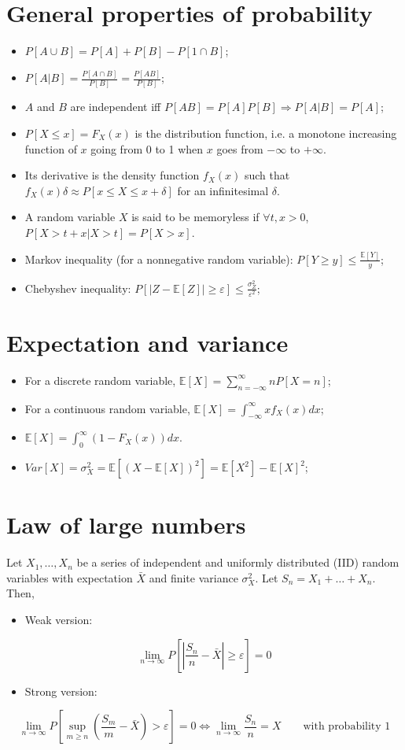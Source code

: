 \documentclass[12pt, openany]{report}
\newcommand{\E}{\mathbb{E}}
\theoremstyle{definition}
\begin{document}
\section{General properties of probability}
\begin{itemize}
  \item $P[A\cup B]=P[A]+P[B]-P[1\cap B]$;
  \item $P[A|B] = \frac{P[A\cap B]}{P[B]} = \frac{P[AB]}{P[B]}$;
  \item $A$ and $B$ are independent iff $P[AB]=P[A]P[B]\Longrightarrow P[A|B]=P[A]$;
  \item $P[X\le x]=F_X(x)$ is the distribution function, i.e. a monotone increasing function of $x$ going from 0 to 1 when $x$ goes from $-\infty$ to $+\infty$.
  \item Its derivative is the density function $f_X(x)$ such that $f_X(x)\delta \approx P[x\le X\le x+\delta]$ for an infinitesimal $\delta$.
  \item A random variable $X$ is said to be memoryless if $\forall t,x>0$, $P[X>t+x|X>t]=P[X>x]$.
  \item Markov inequality (for a nonnegative random variable): $P[Y\ge y] \le \frac{\E[Y]}{y}$;
  \item Chebyshev inequality: $P[|Z-\E[Z]| \ge \varepsilon] \le \frac{\sigma_Z^2}{\varepsilon^2}$;
\end{itemize}
\section{Expectation and variance}
\begin{itemize}
  \item For a discrete random variable, $\E[X]= \sum_{n=-\infty}^\infty nP[X=n]$;
  \item For a continuous random variable, $\E[X]=\int_{-\infty}^\infty xf_X(x)dx$;
  \item $\E[X] = \int_0^\infty (1-F_X(x))dx$.
  \item $Var[X] = \sigma_X^2 = \E[(X-\E[X])^2] = \E[X^2] - \E[X]^2$;
\end{itemize}
\section{Law of large numbers}
Let $X_1,\dots,X_n$ be a series of independent and uniformly distributed (IID) random variables with expectation $\bar X$ and finite variance $\sigma_X^2$. Let $S_n = X_1+\dots +X_n$. Then, 
\begin{itemize}
  \item Weak version:
\end{itemize}
\begin{equation}
  \lim_{n\to \infty} P\left[|\frac{S_n}{n}-\bar X|\ge \varepsilon\right] = 0
\end{equation}
\begin{itemize}
  \item Strong version:
\end{itemize}
\begin{equation}
  \lim_{n\to \infty} P\left[\sup_{m\ge n}\left(\frac{S_m}{m}-\bar X\right)>\varepsilon\right] = 0\Longleftrightarrow \lim_{n\to \infty}\frac{S_n}{n}=X\qquad \text{with probability 1}
\end{equation}
\end{document}
